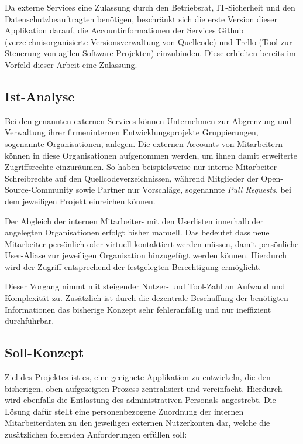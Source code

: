 Da externe Services eine Zulassung durch den Betriebsrat, IT-Sicherheit und den Datenschutzbeauftragten
benötigen, beschränkt sich die erste Version dieser Applikation darauf, die Accountinformationen der
Services Github (verzeichnisorganisierte Versionsverwaltung von Quellcode) und Trello
(Tool zur Steuerung von agilen Software-Projekten) einzubinden. Diese erhielten bereits im Vorfeld
dieser Arbeit eine Zulassung.

\subsection{Ist-Analyse}
\label{sec:Ist-Analyse}
Bei den genannten externen Services können Unternehmen zur Abgrenzung und
Verwaltung ihrer firmeninternen Entwicklungsprojekte Gruppierungen, sogenannte Organisationen, anlegen.
Die externen Accounts von Mitarbeitern können in diese Organisationen aufgenommen werden,
um ihnen damit erweiterte Zugriffsrechte einzuräumen.
So haben beispielsweise nur interne Mitarbeiter Schreibrechte auf den Quellcodeverzeichnissen, während
Mitglieder der Open-Source-Community sowie Partner nur Vorschläge, sogenannte
\textit{Pull Requests}, bei dem jeweiligen Projekt einreichen können.

Der Abgleich der internen Mitarbeiter- mit den Userlisten innerhalb der angelegten Organisationen
erfolgt bisher manuell. Das bedeutet dass neue Mitarbeiter persönlich oder virtuell
kontaktiert werden müssen, damit persönliche User-Aliase zur jeweiligen Organisation hinzugefügt
werden können. Hierdurch wird der Zugriff entsprechend der festgelegten Berechtigung ermöglicht.

Dieser Vorgang nimmt mit steigender Nutzer- und Tool-Zahl an Aufwand und Komplexität zu.
Zusätzlich ist durch die dezentrale Beschaffung der benötigten Informationen das bisherige
Konzept sehr fehleranfällig und nur ineffizient durchführbar.

\subsection{Soll-Konzept}
\label{sec:Soll-Konzept}
Ziel des Projektes ist es, eine geeignete Applikation zu entwickeln, die den bisherigen, oben
aufgezeigten Prozess zentralisiert und vereinfacht. Hierdurch wird ebenfalls die Entlastung des
administrativen Personals angestrebt. Die Lösung dafür stellt eine personenbezogene Zuordnung der
internen Mitarbeiterdaten zu den jeweiligen externen Nutzerkonten dar, welche die zusätzlichen folgenden
Anforderungen erfüllen soll:

